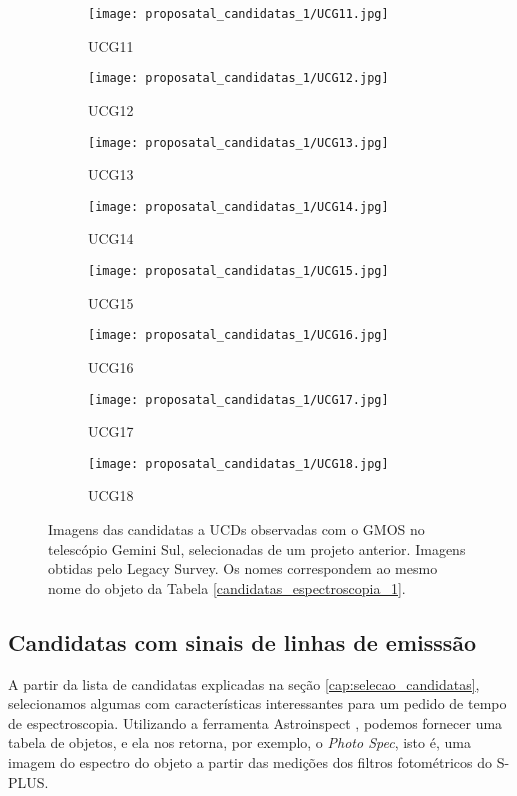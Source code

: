 \begin{figure}[!ht]
\begin{subfigure}[b]{0.22\textwidth}
        \texttt{[image: proposatal\_candidatas\_1/UCG11.jpg]}
        \caption{UCG11}
    \end{subfigure}
    \begin{subfigure}[b]{0.22\textwidth}
        \texttt{[image: proposatal\_candidatas\_1/UCG12.jpg]}
        \caption{UCG12}
    \end{subfigure}
    \begin{subfigure}[b]{0.22\textwidth}
        \texttt{[image: proposatal\_candidatas\_1/UCG13.jpg]}
        \caption{UCG13}
    \end{subfigure}
    \begin{subfigure}[b]{0.22\textwidth}
        \texttt{[image: proposatal\_candidatas\_1/UCG14.jpg]}
        \caption{UCG14}
    \end{subfigure}
    \begin{subfigure}[b]{0.22\textwidth}
        \texttt{[image: proposatal\_candidatas\_1/UCG15.jpg]}
        \caption{UCG15}
    \end{subfigure}
    \begin{subfigure}[b]{0.22\textwidth}
        \texttt{[image: proposatal\_candidatas\_1/UCG16.jpg]}
        \caption{UCG16}
    \end{subfigure}
    \begin{subfigure}[b]{0.22\textwidth}
        \texttt{[image: proposatal\_candidatas\_1/UCG17.jpg]}
        \caption{UCG17}
    \end{subfigure}
    \begin{subfigure}[b]{0.22\textwidth}
        \texttt{[image: proposatal\_candidatas\_1/UCG18.jpg]}
        \caption{UCG18}
    \end{subfigure}
    \caption{Imagens das candidatas a UCDs observadas com o GMOS no telescópio Gemini Sul, selecionadas de um projeto anterior. Imagens obtidas pelo Legacy Survey. Os nomes correspondem ao mesmo nome do objeto da Tabela \ref{candidatas_espectroscopia_1}.}
    \label{candidatas_espectroscopia_1_img}
\end{figure}


\subsection{Candidatas com sinais de linhas de emisssão}\label{subsection:candidatas_emissao}

A partir da lista de candidatas explicadas na seção \ref{cap:selecao_candidatas}, selecionamos algumas com características interessantes para um pedido de tempo de espectroscopia. Utilizando a ferramenta Astroinspect \cite{astroinspect}, podemos fornecer uma tabela de objetos, e ela nos retorna, por exemplo, o \textit{Photo Spec}, isto é, uma imagem do espectro do objeto a partir das medições dos filtros fotométricos do S-PLUS.


